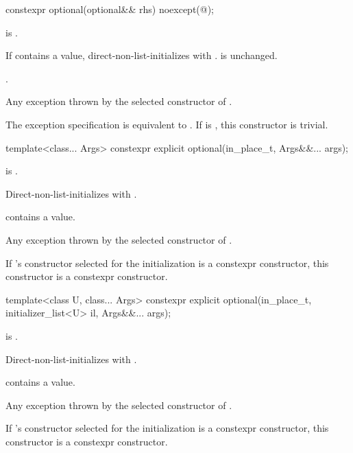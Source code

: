%
\begin{itemdecl}
constexpr optional(optional&& rhs) noexcept(@\seebelow@);
\end{itemdecl}

\begin{itemdescr}
\pnum
\constraints
{} is .

\pnum
\effects
If  contains a value, direct-non-list-initializes 
with .
 is unchanged.

\pnum
\ensures
{}.

\pnum
\throws
Any exception thrown by the selected constructor of .

\pnum
\remarks
The exception specification is equivalent to
.
If  is ,
this constructor is trivial.
\end{itemdescr}

%
\begin{itemdecl}
template<class... Args> constexpr explicit optional(in_place_t, Args&&... args);
\end{itemdecl}

\begin{itemdescr}
\pnum
\constraints
{} is .

\pnum
\effects
Direct-non-list-initializes 
with .

\pnum
\ensures
{} contains a value.

\pnum
\throws
Any exception thrown by the selected constructor of .

\pnum
\remarks
If 's constructor selected for the initialization is a constexpr constructor, this constructor is a constexpr constructor.
\end{itemdescr}

%
\begin{itemdecl}
template<class U, class... Args>
  constexpr explicit optional(in_place_t, initializer_list<U> il, Args&&... args);
\end{itemdecl}

\begin{itemdescr}
\pnum
\constraints
{} is .

\pnum
\effects
Direct-non-list-initializes 
with .

\pnum
\ensures
{} contains a value.

\pnum
\throws
Any exception thrown by the selected constructor of .

\pnum
\remarks
If 's constructor selected for the initialization is a constexpr constructor, this constructor is a constexpr constructor.
\end{itemdescr}


